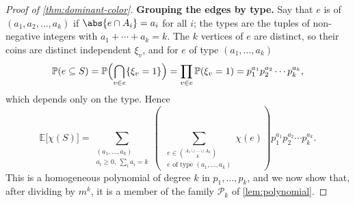 \begin{proof}[Proof of \autoref{thm:dominant-color}]
    \textbf{Grouping the edges by type.} Say that \(e\) is of  \((a_1, a_2, \ldots, a_k)\) if \(\abs{e \cap A_i} = a_i\) for all \(i\); the types are the tuples of non-negative integers with \(a_1 + \cdots + a_k = k\). The \(k\) vertices of \(e\) are distinct, so their coins are distinct independent \(\xi_v\), and for \(e\) of type \((a_1, \ldots, a_k)\)
    \[
        \mathbb{P}(e \subseteq S) = \mathbb{P}\Bigl( \bigcap_{v \in e} \{\xi_v = 1\} \Bigr) = \prod_{v \in e} \mathbb{P}(\xi_v = 1) = p_1^{a_1} p_2^{a_2} \cdots p_k^{a_k},
    \]
    which depends only on the type. Hence
    \[
        \mathbb{E}\bigl[ \chi(S) \bigr]
        = \sum_{\substack{(a_1, \ldots, a_k) \\ a_i \ge 0, \ \sum_i a_i = k}}
          \left( \ \sum_{\substack{e \in \binom{A_1 \cup \cdots \cup A_k}{k} \\ e \text{ of type } (a_1, \ldots, a_k)}} \chi(e) \right) p_1^{a_1} p_2^{a_2} \cdots p_k^{a_k}.
    \]
    This is a homogeneous polynomial of degree \(k\) in \(p_1, \ldots, p_k\), and we now show that, after dividing by \(m^k\), it is a member of the family \(\mathcal{P}_k\) of \autoref{lem:polynomial}.


\end{proof}
